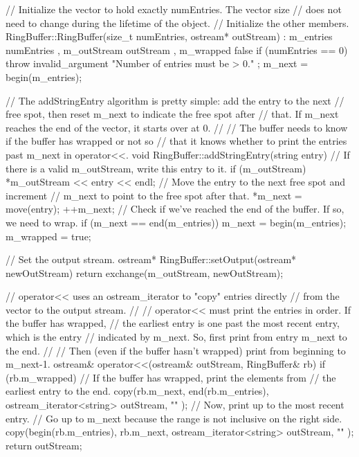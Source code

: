 \begin{cpp}
// Initialize the vector to hold exactly numEntries. The vector size
// does not need to change during the lifetime of the object.
// Initialize the other members.
RingBuffer::RingBuffer(size_t numEntries, ostream* outStream)
    : m_entries { numEntries }, m_outStream { outStream }, m_wrapped { false }
{
    if (numEntries == 0) {
        throw invalid_argument { "Number of entries must be > 0." };
    }
    m_next = begin(m_entries);
}

// The addStringEntry algorithm is pretty simple: add the entry to the next
// free spot, then reset m_next to indicate the free spot after
// that. If m_next reaches the end of the vector, it starts over at 0.
//
// The buffer needs to know if the buffer has wrapped or not so
// that it knows whether to print the entries past m_next in operator<<.
void RingBuffer::addStringEntry(string entry)
{
    // If there is a valid m_outStream, write this entry to it.
    if (m_outStream) { *m_outStream << entry << endl; }
    // Move the entry to the next free spot and increment
    // m_next to point to the free spot after that.
    *m_next = move(entry);
    ++m_next;
    // Check if we've reached the end of the buffer. If so, we need to wrap.
    if (m_next == end(m_entries)) {
        m_next = begin(m_entries);
        m_wrapped = true;
    }
}

// Set the output stream.
ostream* RingBuffer::setOutput(ostream* newOutStream)
{
    return exchange(m_outStream, newOutStream);
}

// operator<< uses an ostream_iterator to "copy" entries directly
// from the vector to the output stream.
//
// operator<< must print the entries in order. If the buffer has wrapped,
// the earliest entry is one past the most recent entry, which is the entry
// indicated by m_next. So, first print from entry m_next to the end.
//
// Then (even if the buffer hasn't wrapped) print from beginning to m_next-1.
ostream& operator<<(ostream& outStream, RingBuffer& rb)
{
    if (rb.m_wrapped) {
        // If the buffer has wrapped, print the elements from
        // the earliest entry to the end.
        copy(rb.m_next, end(rb.m_entries),
        ostream_iterator<string>{ outStream, "\n" });
    }
    // Now, print up to the most recent entry.
    // Go up to m_next because the range is not inclusive on the right side.
    copy(begin(rb.m_entries), rb.m_next,
    ostream_iterator<string>{ outStream, "\n" });
    return outStream;
}
\end{cpp}

